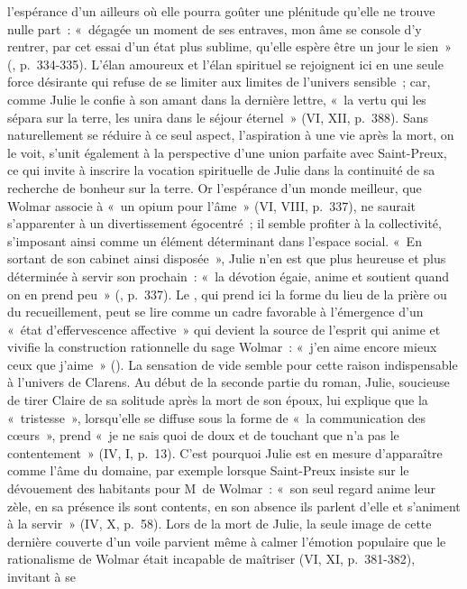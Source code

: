 \documentclass[11pt,twoside,openany]{book}
\newenvironment{lateiDocument}{}{}
\begin{document}
\begin{lateiDocument}
\begin{teiElement}[name={TEI},change={commons\_edition}]
\begin{teiElement}[name={text},type={book},xmlid={book}]
\begin{teiElement}[name={group},type={book},xmlid={book-001}]
\begin{teiElement}[name={group},type={section1},xmlid={section1-001}]
\begin{teiElement}
\begin{teiElement}[name={body},xmlid={body-002}]
\begin{teiDiv}[type={section1},xmlid={div03}]
l’espérance d’un ailleurs où elle pourra goûter une plénitude qu’elle ne trouve nulle part : « dégagée un moment de ses entraves, \lbrack{}mon âme\rbrack{} se console d’y rentrer, par cet essai d’un état plus sublime, qu’elle espère être un jour le sien » (, p. 334-335). L’élan amoureux et l’élan spirituel se rejoignent ici en une seule force désirante qui refuse de se limiter aux limites de l’univers sensible ; car, comme Julie le confie à son amant dans la dernière lettre, « la vertu qui \lbrack{}les\rbrack{} sépara sur la terre, les unira dans le séjour éternel » (VI, XII, p. 388). Sans naturellement se réduire à ce seul aspect, l’aspiration à une vie après la mort, on le voit, s’unit également à la perspective d’une union parfaite avec Saint-Preux, ce qui invite à inscrire la vocation spirituelle de Julie dans la continuité de sa recherche de bonheur sur la terre. Or l’espérance d’un monde meilleur, que Wolmar associe à « un opium pour l’âme » (VI, VIII, p. 337), ne saurait s’apparenter à un divertissement égocentré ; il semble profiter à la collectivité, s’imposant ainsi comme un élément déterminant dans l’espace social. « En sortant de \lbrack{}s\rbrack{}on cabinet ainsi disposée », Julie n’en est que plus heureuse et plus déterminée à servir son prochain : « \lbrack{}la dévotion\rbrack{} égaie, anime et soutient quand on en prend peu » (, p. 337). Le , qui prend ici la forme du lieu de la prière ou du recueillement, peut se lire comme un cadre favorable à l’émergence d’un « état d’effervescence affective » qui devient la source de l’esprit qui anime et vivifie la construction rationnelle du sage Wolmar : « j’en aime encore mieux ceux que j’aime » (). La sensation de vide semble pour cette raison indispensable à l’univers de Clarens. Au début de la seconde partie du roman, Julie, soucieuse de tirer Claire de sa solitude après la mort de son époux, lui explique que la « tristesse », lorsqu’elle se diffuse sous la forme de « la communication des cœurs », prend « je ne sais quoi de doux et de touchant que n’a pas le contentement » (IV, I, p. 13). C’est pourquoi Julie est en mesure d’apparaître comme l’âme du domaine, par exemple lorsque Saint-Preux insiste sur le dévouement des habitants pour M de Wolmar : « son seul regard anime leur zèle, en sa présence ils sont contents, en son absence ils parlent d’elle et s’animent à la servir » (IV, X, p. 58). Lors de la mort de Julie, la seule image de cette dernière couverte d’un voile parvient même à calmer l’émotion populaire que le rationalisme de Wolmar était incapable de maîtriser (VI, XI, p. 381-382), invitant à se 
\end{teiDiv}
\end{teiElement}
\end{teiElement}
\end{teiElement}
\end{teiElement}
\end{teiElement}
\end{teiElement}
\end{lateiDocument}
\end{document}
